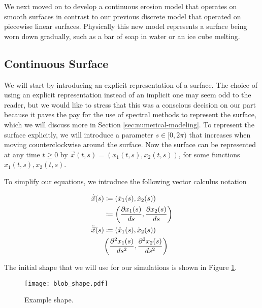 
We next moved on to develop a continuous erosion model that operates on smooth surfaces in contrast to our previous discrete model that operated on piecewise linear surfaces. Physically this new model represents a surface being worn down gradually, such as a bar of soap in water or an ice cube melting. 

\subsection*{Continuous Surface}

We will start by introducing an explicit representation of a surface. The choice of using an explicit representation instead of an implicit one may seem odd to the reader, but we would like to stress that this was a conscious decision on our part because it paves the pay for the use of spectral methods to represent the surface, which we will discuss more in Section \ref{sec:numerical-modeling}. To represent the surface explicitly, we will introduce a parameter $s \in [0, 2\pi)$ that increases when moving counterclockwise around the surface. Now the surface can be represented at any time $t \ge 0$ by $\vec{x}(t, s) = (x_1(t, s), x_2(t, s))$, for some functions $x_1(t, s), x_2(t, s)$.

To simplify our equations, we introduce the following vector calculus notation

\begin{align*}
  \dot{\vec{x}}(s)& \coloneqq \paren{\dot{x}_1(s), \dot{x}_2(s)}\\
  & \coloneqq \paren{\frac{\partial x_1(s)}{ds}, \frac{\partial x_2(s)}{ds}}\\
  \ddot{\vec{x}}(s)& \coloneqq \paren{\ddot{x}_1(s), \ddot{x}_2(s)}\\
  & \paren{\frac{\partial^2 x_1(s)}{ds^2}, \frac{\partial^2 x_2(s)}{ds^2}}
\end{align*}

The initial shape that we will use for our simulations is shown in Figure \ref{fig:blob-shape}.

\begin{figure}[H]
  \begin{center}
    \texttt{[image: blob\_shape.pdf]}
  \end{center}
  \vspace{-.2in} %
  \caption{\label{fig:blob-shape} Example shape.}
\end{figure}


